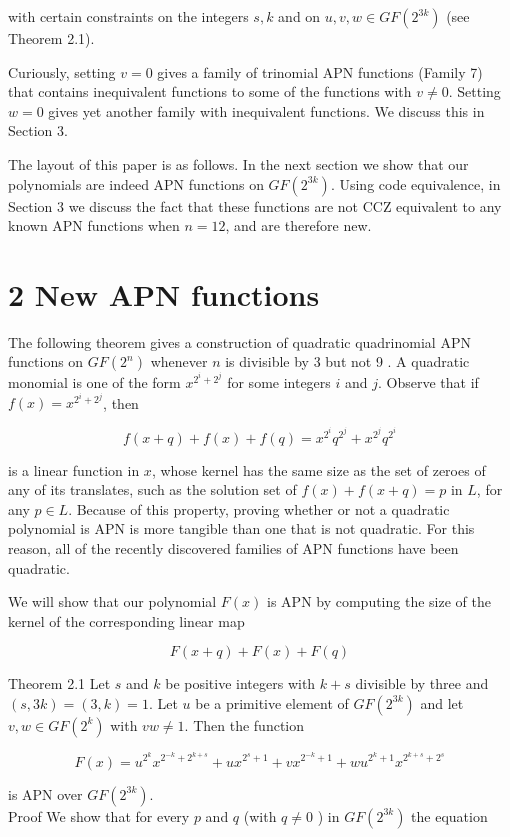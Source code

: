 \documentclass[10pt]{article}
\begin{document}
with certain constraints on the integers $s, k$ and on $u, v, w \in G F\left(2^{3 k}\right)$ (see Theorem 2.1).

Curiously, setting $v=0$ gives a family of trinomial APN functions (Family 7) that contains inequivalent functions to some of the functions with $v \neq 0$. Setting $w=0$ gives yet another family with inequivalent functions. We discuss this in Section 3.

The layout of this paper is as follows. In the next section we show that our polynomials are indeed APN functions on $G F\left(2^{3 k}\right)$. Using code equivalence, in Section 3 we discuss the fact that these functions are not CCZ equivalent to any known APN functions when $n=12$, and are therefore new.

\section*{2 New APN functions}
The following theorem gives a construction of quadratic quadrinomial APN functions on $G F\left(2^{n}\right)$ whenever $n$ is divisible by 3 but not 9 . A quadratic monomial is one of the form $x^{2^{i}+2^{j}}$ for some integers $i$ and $j$. Observe that if $f(x)=x^{2^{i}+2^{j}}$, then

$$
f(x+q)+f(x)+f(q)=x^{2^{i}} q^{2^{j}}+x^{2^{j}} q^{2^{i}}
$$

is a linear function in $x$, whose kernel has the same size as the set of zeroes of any of its translates, such as the solution set of $f(x)+f(x+q)=p$ in $L$, for any $p \in L$. Because of this property, proving whether or not a quadratic polynomial is APN is more tangible than one that is not quadratic. For this reason, all of the recently discovered families of APN functions have been quadratic.

We will show that our polynomial $F(x)$ is APN by computing the size of the kernel of the corresponding linear map

$$
F(x+q)+F(x)+F(q)
$$

Theorem 2.1 Let $s$ and $k$ be positive integers with $k+s$ divisible by three and $(s, 3 k)= (3, k)=1$. Let $u$ be a primitive element of $G F\left(2^{3 k}\right)$ and let $v, w \in G F\left(2^{k}\right)$ with $v w \neq 1$. Then the function

$$
F(x)=u^{2^{k}} x^{2^{-k}+2^{k+s}}+u x^{2^{s}+1}+v x^{2^{-k}+1}+w u^{2^{k}+1} x^{2^{k+s}+2^{s}}
$$

is APN over $G F\left(2^{3 k}\right)$.\\
Proof We show that for every $p$ and $q$ (with $q \neq 0$ ) in $G F\left(2^{3 k}\right)$ the equation
\end{document}

